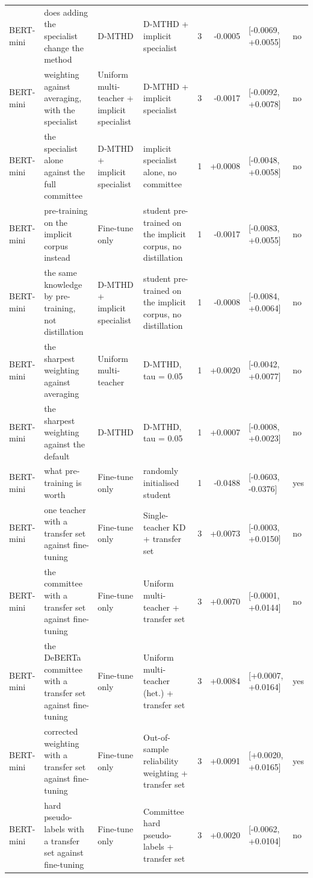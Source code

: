 \begin{table}[t]
\begin{tabular}{llllrrll}
BERT-mini & does adding the specialist change the method & D-MTHD & D-MTHD + implicit specialist & 3 & -0.0005 & [-0.0069, +0.0055] & no \\
BERT-mini & weighting against averaging, with the specialist & Uniform multi-teacher + implicit specialist & D-MTHD + implicit specialist & 3 & -0.0017 & [-0.0092, +0.0078] & no \\
BERT-mini & the specialist alone against the full committee & D-MTHD + implicit specialist & implicit specialist alone, no committee & 1 & +0.0008 & [-0.0048, +0.0058] & no \\
BERT-mini & pre-training on the implicit corpus instead & Fine-tune only & student pre-trained on the implicit corpus, no distillation & 1 & -0.0017 & [-0.0083, +0.0055] & no \\
BERT-mini & the same knowledge by pre-training, not distillation & D-MTHD + implicit specialist & student pre-trained on the implicit corpus, no distillation & 1 & -0.0008 & [-0.0084, +0.0064] & no \\
BERT-mini & the sharpest weighting against averaging & Uniform multi-teacher & D-MTHD, tau = 0.05 & 1 & +0.0020 & [-0.0042, +0.0077] & no \\
BERT-mini & the sharpest weighting against the default & D-MTHD & D-MTHD, tau = 0.05 & 1 & +0.0007 & [-0.0008, +0.0023] & no \\
BERT-mini & what pre-training is worth & Fine-tune only & randomly initialised student & 1 & -0.0488 & [-0.0603, -0.0376] & yes \\
BERT-mini & one teacher with a transfer set against fine-tuning & Fine-tune only & Single-teacher KD + transfer set & 3 & +0.0073 & [-0.0003, +0.0150] & no \\
BERT-mini & the committee with a transfer set against fine-tuning & Fine-tune only & Uniform multi-teacher + transfer set & 3 & +0.0070 & [-0.0001, +0.0144] & no \\
BERT-mini & the DeBERTa committee with a transfer set against fine-tuning & Fine-tune only & Uniform multi-teacher (het.) + transfer set & 3 & +0.0084 & [+0.0007, +0.0164] & yes \\
BERT-mini & corrected weighting with a transfer set against fine-tuning & Fine-tune only & Out-of-sample reliability weighting + transfer set & 3 & +0.0091 & [+0.0020, +0.0165] & yes \\
BERT-mini & hard pseudo-labels with a transfer set against fine-tuning & Fine-tune only & Committee hard pseudo-labels + transfer set & 3 & +0.0020 & [-0.0062, +0.0104] & no \\

\end{tabular}
\end{table}
